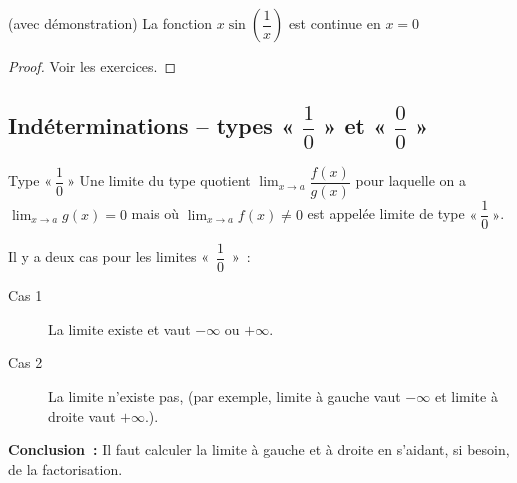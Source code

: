 \documentclass[a4paper,12pt]{article}
\begin{document}
\begin{coro}
(avec démonstration)
	\tcblower 
	La fonction $x\sin\left(\dfrac{1}{x}\right)$ est continue en $x=0$

	\begin{proof}
Voir les exercices. 
	\end{proof}
	
\end{coro}
\subsection{Indéterminations -- types « $\dfrac{1}{0}$ » et « $\dfrac{0}{0}$ »}
\begin{definition}
	Type $«~\dfrac{1}{0}~»$
	\tcblower
	Une limite du type quotient \(\displaystyle \lim_{x\to a}\dfrac{f(x)}{g(x)}\) pour laquelle on a \(\displaystyle \lim_{x\to a}g(x)=0\) mais où \(\displaystyle \lim_{x\to a}f(x)\neq0\) est appelée limite de type \(«~\displaystyle \dfrac{1}{0}~»\). 
\end{definition}
\begin{remarque}
	\tcblower
	Il y a deux cas pour les limites «~$\dfrac{1}{0}$~»~:
	\begin{description}
		\item[Cas 1] La limite existe et vaut $-\infty$ ou $+\infty$.
		\item[Cas 2] La limite n'existe pas, (par exemple, limite à gauche vaut $-\infty$ et limite à droite vaut $+\infty$.).
	\end{description}
	{\bfseries Conclusion~:} Il faut calculer la limite à gauche et à droite en s'aidant, si besoin, de la factorisation.
\end{remarque}
\end{document}
